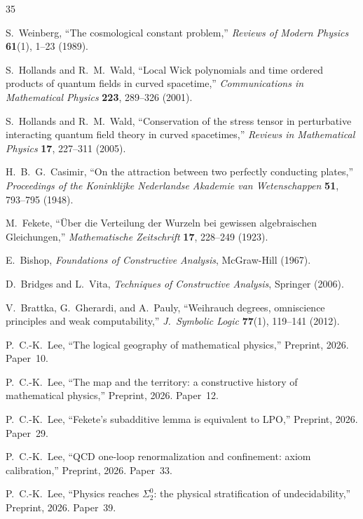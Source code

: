 \documentclass[11pt,a4paper]{article}
\theoremstyle{plain}
\theoremstyle{definition}
\begin{document}
\begin{thebibliography}{35}

S.~Weinberg,
``The cosmological constant problem,''
\emph{Reviews of Modern Physics} \textbf{61}(1), 1--23 (1989).

S.~Hollands and R.~M.~Wald,
``Local Wick polynomials and time ordered products of quantum fields
in curved spacetime,''
\emph{Communications in Mathematical Physics} \textbf{223}, 289--326 (2001).

S.~Hollands and R.~M.~Wald,
``Conservation of the stress tensor in perturbative interacting quantum
field theory in curved spacetimes,''
\emph{Reviews in Mathematical Physics} \textbf{17}, 227--311 (2005).

H.~B.~G.~Casimir,
``On the attraction between two perfectly conducting plates,''
\emph{Proceedings of the Koninklijke Nederlandse Akademie van Wetenschappen}
\textbf{51}, 793--795 (1948).

M.~Fekete,
``{\"U}ber die Verteilung der Wurzeln bei gewissen algebraischen Gleichungen,''
\emph{Mathematische Zeitschrift} \textbf{17}, 228--249 (1923).

E.~Bishop,
\emph{Foundations of Constructive Analysis},
McGraw-Hill (1967).

D.~Bridges and L.~Vita,
\emph{Techniques of Constructive Analysis},
Springer (2006).

V.~Brattka, G.~Gherardi, and A.~Pauly,
``Weihrauch degrees, omniscience principles and weak computability,''
\emph{J.\ Symbolic Logic} \textbf{77}(1), 119--141 (2012).

P.~C.-K.~Lee,
``The logical geography of mathematical physics,''
Preprint, 2026. Paper~10.

P.~C.-K.~Lee,
``The map and the territory: a constructive history of
  mathematical physics,''
Preprint, 2026. Paper~12.

P.~C.-K.~Lee,
``Fekete's subadditive lemma is equivalent to LPO,''
Preprint, 2026. Paper~29.

P.~C.-K.~Lee,
``QCD one-loop renormalization and confinement: axiom calibration,''
Preprint, 2026. Paper~33.

P.~C.-K.~Lee,
``Physics reaches $\Sigma_2^0$: the physical stratification of undecidability,''
Preprint, 2026. Paper~39.


\end{thebibliography}
\end{document}
